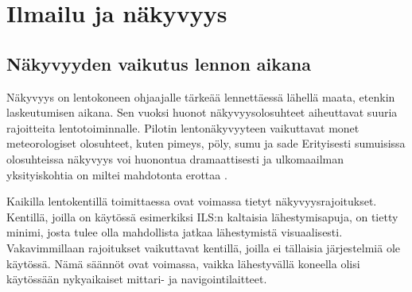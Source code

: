 \documentclass[utf8,bachelor,manualbib]{gradu3}
\begin{document}
\chapter{Ilmailu ja näkyvyys}

\section{Näkyvyyden vaikutus lennon aikana}

Näkyvyys on lentokoneen ohjaajalle tärkeää lennettäessä lähellä maata, etenkin laskeutumisen aikana. Sen vuoksi huonot näkyvyysolosuhteet aiheuttavat suuria rajoitteita lentotoiminnalle. \cite{mollersachs1994} Pilotin lentonäkyvyyteen vaikuttavat monet meteorologiset olosuhteet, kuten pimeys, pöly, sumu ja sade \citep{wickens2009} Erityisesti sumuisissa olosuhteissa näkyvyys voi huonontua dramaattisesti ja ulkomaailman yksityiskohtia on miltei mahdotonta erottaa \citep{beiergemperlein2004}.

Kaikilla lentokentillä toimittaessa ovat voimassa tietyt näkyvyysrajoitukset. Kentillä, joilla on käytössä esimerkiksi ILS:n kaltaisia lähestymisapuja, on tietty minimi, josta tulee olla mahdollista jatkaa lähestymistä visuaalisesti. Vakavimmillaan rajoitukset vaikuttavat kentillä, joilla ei tällaisia järjestelmiä ole käytössä. Nämä säännöt ovat voimassa, vaikka lähestyvällä koneella olisi käytössään nykyaikaiset mittari- ja navigointilaitteet.~\cite{mollersachs1994}
\end{document}
